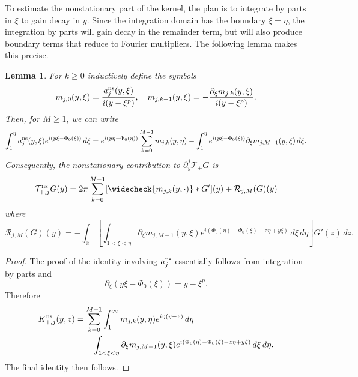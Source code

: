 \documentclass[11pt]{amsart}
\newtheorem{lemma}[theorem]{Lemma}
\theoremstyle{definition}
\theoremstyle{remark}
\numberwithin{equation}{section}
\newcommand{\R}{\mathbb{R}}
\newcommand{\mc}[1]{\mathcal{#1}}
\begin{document}
To estimate the nonstationary part of the kernel, the plan is to integrate by parts in $\xi$ to gain decay in $y$. Since the integration domain has the boundary $\xi = \eta$, the integration by parts will gain decay in the remainder term, but will also produce boundary terms that reduce to Fourier multipliers. The following lemma makes this precise.

\begin{lemma}\label{lem:linear_nonstationary_symbol_expansion}
    For $k \geq 0$ inductively define the symbols 
    \begin{equation}\label{eqn:linear_nonstationary_symbols}m_{j,0}(y, \xi) = \frac{a_j^{\textup{ns}}(y, \xi)}{i(y - \xi^p)}, \quad m_{j,k+1}(y, \xi) = -\frac{\partial_\xi m_{j,k}(y, \xi)}{i(y - \xi^p)}.\end{equation}
    Then, for $M \geq 1$, we can write 
    \[ \int_{1}^{\eta}a_j^{\textup{ns}}(y,\xi)e^{i(y\xi - \Phi_0(\xi))} \, d\xi
         = e^{i(y\eta - \Phi_0(\eta))}\sum_{k = 0}^{M - 1}m_{j,k}(y, \eta)  - \int_{1}^{\eta}e^{i(y\xi - \Phi_0(\xi))}\partial_\xi m_{j,M-1}(y, \xi) \, d\xi.\]
    Consequently, the nonstationary contribution to $\partial_y^j\mc{T}_{+}G$ is
    \begin{equation}\label{eqn:linear_nonstationary_expansion}\mc{T}_{+,j}^{\textup{ns}}G(y) = 2\pi\sum_{k = 0}^{M-1} [\widecheck{m_{j,k}(y, \cdot)} * G'](y) + \mc{R}_{j,M}(G)(y)\end{equation}
    where
    \begin{equation}\label{eqn:linear_nonstationary_remainder_definition}\mc{R}_{j,M}(G)(y) = -\int_{\R} \left[\int_{1<\xi<\eta}
    \partial_\xi m_{j,M-1}(y,\xi)
    e^{i(\Phi_0(\eta)-\Phi_0(\xi)-z\eta+y\xi)}\,d\xi\,d\eta \right] G'(z) \,dz.\end{equation}
\end{lemma}

\begin{proof}
    The proof of the identity involving $a_j^{\textup{ns}}$ essentially follows from integration by parts and 
    \[\partial_\xi(y\xi - \Phi_0(\xi)) = y - \xi^p.\]
    Therefore
    \begin{align*}
        K_{+,j}^{\textup{ns}}(y, z)
        & = \sum_{k=0}^{M-1}\int_1^\infty m_{j,k}(y,\eta)e^{i\eta(y-z)}\,d\eta\\
        &\quad-\int_{1<\xi<\eta}\partial_\xi m_{j,M-1}(y,\xi)
        e^{i(\Phi_0(\eta)-\Phi_0(\xi)-z\eta+y\xi)}\,d\xi\,d\eta.
    \end{align*}
    The final identity then follows.
\end{proof}
\end{document}
